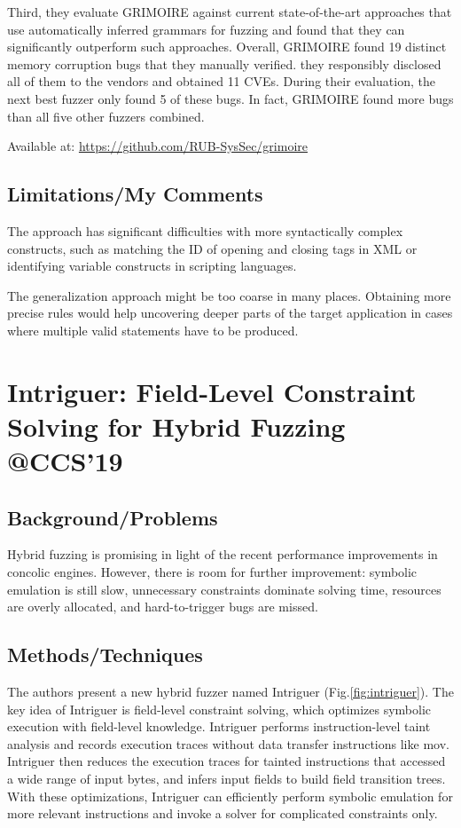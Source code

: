  Third, they evaluate GRIMOIRE against current state-of-the-art approaches that use automatically inferred grammars for fuzzing and found that they can significantly outperform such approaches. Overall, GRIMOIRE found 19 distinct memory corruption bugs that they manually verified. they responsibly disclosed all of them to the vendors and obtained 11 CVEs. During their evaluation, the next best fuzzer only found 5 of these bugs. In fact, GRIMOIRE found more bugs than all five other fuzzers combined.
 
 Available at: \url{https://github.com/RUB-SysSec/grimoire}
\subsection{Limitations/My Comments}
The approach has significant difficulties with more syntactically complex constructs, such as matching the ID of opening and closing tags in XML or identifying variable constructs in scripting languages. 

The generalization approach might be too coarse in many places. Obtaining more precise rules would help uncovering deeper parts of the target application in cases where multiple valid statements have to be produced. 
\newpage
\section{Intriguer: Field-Level Constraint Solving for Hybrid Fuzzing @CCS'19}
\subsection{Background/Problems}
Hybrid fuzzing is promising in light of the recent performance improvements in concolic engines. However, there is room for further improvement: symbolic emulation is still slow, unnecessary constraints dominate solving time, resources are overly allocated, and hard-to-trigger bugs are missed.

\subsection{Methods/Techniques}
The authors present a new hybrid fuzzer named Intriguer (Fig.\ref{fig:intriguer}). The key idea of Intriguer is field-level constraint solving, which optimizes symbolic execution with field-level knowledge. Intriguer performs instruction-level taint analysis and records execution traces without data transfer instructions like mov. Intriguer then reduces the execution traces for tainted instructions that accessed a wide range of input bytes, and infers input fields to build field transition trees. With these optimizations, Intriguer can efficiently perform symbolic emulation for more relevant instructions and invoke a solver for complicated constraints only.

